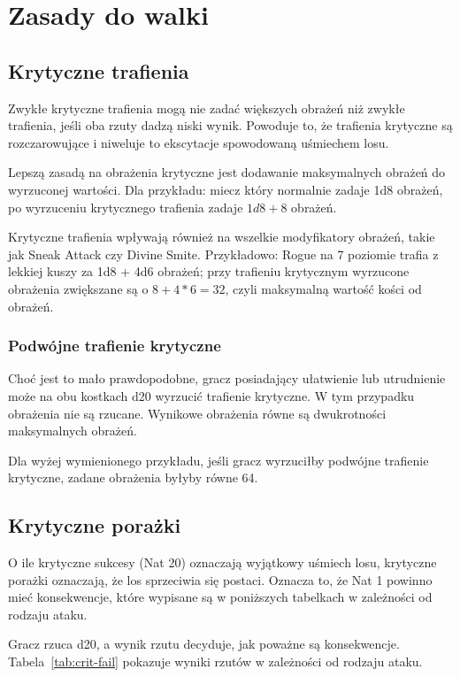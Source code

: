 \section{Zasady do walki}

\subsection{Krytyczne trafienia}

Zwykłe	krytyczne  trafienia  mogą	nie  zadać	większych  obrażeń	niż   zwykłe
trafienia, jeśli oba  rzuty  dadzą	niski  wynik.	Powoduje  to,  że  trafienia
krytyczne są rozczarowujące i niweluje to ekscytacje spowodowaną uśmiechem losu.

Lepszą zasadą na obrażenia krytyczne  jest	dodawanie  maksymalnych  obrażeń  do
wyrzuconej wartości. Dla przykładu: miecz który normalnie zadaje 1d8 obrażeń, po
wyrzuceniu krytycznego trafienia zadaje $1d8 + 8$ obrażeń.

Krytyczne trafienia wpływają również na wszelkie modyfikatory obrażeń, takie jak
Sneak Attack czy Divine Smite. Przykładowo: Rogue na 7 poziomie trafia z lekkiej
kuszy za 1d8 +	4d6  obrażeń;  przy  trafieniu	krytycznym	wyrzucone  obrażenia
zwiększane są o $8 + 4*6 = 32$,  czyli	maksymalną	wartość  kości	od	obrażeń.

\subsubsection{Podwójne trafienie krytyczne}

Choć jest to mało prawdopodobne, gracz posiadający	ułatwienie	lub  utrudnienie
może na obu kostkach d20 wyrzucić trafienie krytyczne. W tym przypadku obrażenia
nie są rzucane.  Wynikowe obrażenia równe są dwukrotności maksymalnych	obrażeń.

Dla wyżej wymienionego przykładu,  jeśli  gracz  wyrzuciłby  podwójne  trafienie
krytyczne, zadane obrażenia byłyby równe 64.

\subsection{Krytyczne porażki}

O ile krytyczne sukcesy (Nat 20) oznaczają	wyjątkowy  uśmiech	losu,  krytyczne
porażki oznaczają, że los sprzeciwia się postaci.  Oznacza to, że Nat 1  powinno
mieć konsekwencje, które wypisane są w	poniższych	tabelkach  w  zależności  od
rodzaju ataku.

Gracz  rzuca  d20,	a  wynik  rzutu  decyduje,	jak  poważne  są   konsekwencje.
Tabela~\ref{tab:crit-fail} pokazuje wyniki rzutów w zależności od rodzaju ataku.

